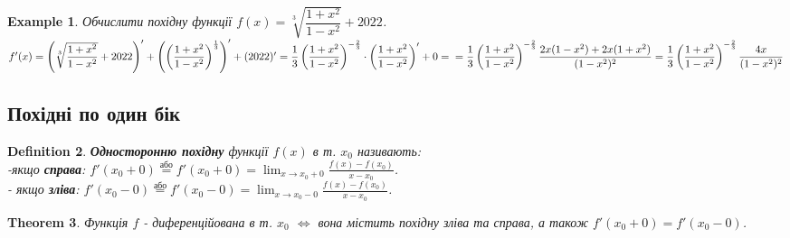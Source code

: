 \documentclass[a4paper, 14pt]{article}
\theoremstyle{theoremdd}
\newtheorem{theorem}{Theorem}[subsection]
\theoremstyle{theoremdd}
\newtheorem{definition}[theorem]{Definition}
\theoremstyle{theoremdd}
\theoremstyle{theoremdd}
\newtheorem{example}[theorem]{Example}
\theoremstyle{theoremdd}
\theoremstyle{theoremdd}
\theoremstyle{theoremdd}
\theoremstyle{theoremdd}
\begin{document}
\iffalse
Тут треба більш детально про $f(x) = \ln(x+\sqrt{1+x^2})$ сказати.\\
Розглянемо рівняння $\sh x = y$.\\
Розв'яжемо її відносно $x$.\\
$\displaystyle \frac{e^x-e^{-x}}{2} = y \Rightarrow e^x-e^{-x}=2y \Rightarrow e^{2x}- 2y e^x - 1 = 0$\\
$\Rightarrow e^x = y \pm \sqrt{1+y^2} \Rightarrow e^x = y + \sqrt{1+y^2}$\\
$\Rightarrow x = \ln(y + \sqrt{1+y^2})$\\
Таким чином, можна стверджувати, що $\ln(y+\sqrt{1+y^2}) = \textrm{arcsh } y$.\\
Але найбільше застосування все ж таки виявляється згодом (коли підуть інтеграли).
\fi

\begin{example} Обчислити похідну функції $f(x) = \sqrt[3]{\dfrac{1+x^2}{1-x^2}} + 2022$.\\
$f'(x) = \left( \sqrt[3]{\dfrac{1+x^2}{1-x^2}} + 2022 \right)' + \left(\left( \dfrac{1+x^2}{1-x^2} \right)^{\frac{1}{3}} \right)' + (2022)' = \dfrac{1}{3} \left( \dfrac{1+x^2}{1-x^2} \right)^{-\frac{2}{3}} \cdot \left( \dfrac{1+x^2}{1-x^2} \right)' + 0 = \\ = \dfrac{1}{3} \left( \dfrac{1+x^2}{1-x^2} \right)^{-\frac{2}{3}} \dfrac{2x(1-x^2)+2x(1+x^2)}{(1-x^2)^2} = \dfrac{1}{3} \left( \dfrac{1+x^2}{1-x^2} \right)^{-\frac{2}{3}} \dfrac{4x}{(1-x^2)^2}$
\end{example}

\subsection{Похідні по один бік}
\begin{definition}
\textbf{Односторонню похідну} функції $f(x)$ в т. $x_0$ називають:\\
-якщо \textbf{справа}: $\displaystyle f'(x_0+0) \overset{\text{або}}{=} f'(x_0+0) = \lim_{x \to x_0+0} \frac{f(x)-f(x_0)}{x-x_0}$.\\
- якщо \textbf{зліва}: $\displaystyle f'(x_0-0) \overset{\text{або}}{=} f'(x_0-0) = \lim_{x \to x_0-0} \frac{f(x)-f(x_0)}{x-x_0}$.
\end{definition}

\begin{theorem}
Функція $f$ - диференційована в т. $x_0$ $\iff$ вона містить похідну зліва та справа, а також $f'(x_0+0) = f'(x_0-0)$.
\end{theorem}
\end{document}
